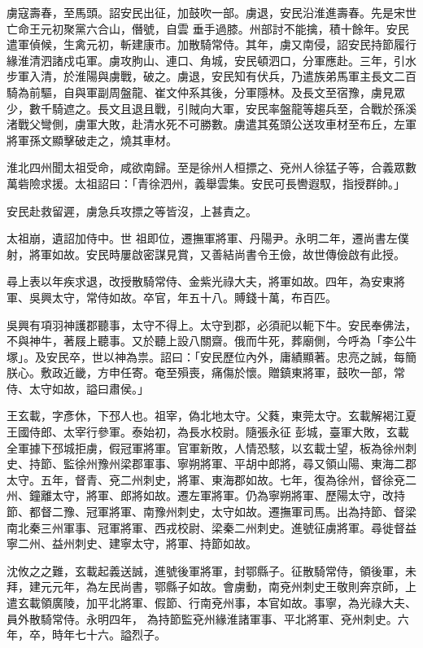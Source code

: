 \begin{pinyinscope}
 虜寇壽春，至馬頭。詔安民出征，加鼓吹一部。虜退，安民沿淮進壽春。先是宋世亡命王元初聚黨六合山，僭號，自雲
 垂手過膝。州部討不能擒，積十餘年。安民遣軍偵候，生禽元初，斬建康市。加散騎常侍。其年，虜又南侵，詔安民持節履行緣淮清泗諸戍屯軍。虜攻朐山、連口、角城，安民頓泗口，分軍應赴。三年，引水步軍入清，於淮陽與虜戰，破之。虜退，安民知有伏兵，乃遣族弟馬軍主長文二百騎為前驅，自與軍副周盤龍、崔文仲系其後，分軍隱林。及長文至宿豫，虜見眾少，數千騎遮之。長文且退且戰，引賊向大軍，安民率盤龍等趨兵至，合戰於孫溪渚戰父彎側，虜軍大敗，赴清水死不可勝數。虜遣其菟頭公送攻車材至布丘，左軍將軍孫文顯擊破走之，燒其車材。



 淮北四州聞太祖受命，咸欲南歸。至是徐州人桓摽之、兗州人徐猛子等，合義眾數萬砦險求援。太祖詔曰：「青徐泗州，義舉雲集。安民可長轡遐馭，指授群帥。」



 安民赴救留遲，虜急兵攻摽之等皆沒，上甚責之。



 太祖崩，遺詔加侍中。世
 祖即位，遷撫軍將軍、丹陽尹。永明二年，遷尚書左僕射，將軍如故。安民時屢啟密謀見賞，又善結尚書令王儉，故世傳儉啟有此授。



 尋上表以年疾求退，改授散騎常侍、金紫光祿大夫，將軍如故。四年，為安東將軍、吳興太守，常侍如故。卒官，年五十八。賻錢十萬，布百匹。



 吳興有項羽神護郡聽事，太守不得上。太守到郡，必須祀以軛下牛。安民奉佛法，不與神牛，著屐上聽事。又於聽上設八關齋。俄而牛死，葬廟側，今呼為「李公牛塚」。及安民卒，世以神為祟。詔曰：「安民歷位內外，庸績顯著。忠亮之誠，每簡朕心。敷政近畿，方申任寄。奄至殞喪，痛傷於懷。贈鎮東將軍，鼓吹一部，常侍、太守如故，謚曰肅侯。」



 王玄載，字彥休，下邳人也。祖宰，偽北地太守。父蕤，東莞太守。玄載解褐江夏王國侍郎、太宰行參軍。泰始初，為長水校尉。隨張永征
 彭城，臺軍大敗，玄載全軍據下邳城拒虜，假冠軍將軍。官軍新敗，人情恐駭，以玄載士望，板為徐州刺史、持節、監徐州豫州梁郡軍事、寧朔將軍、平胡中郎將，尋又領山陽、東海二郡太守。五年，督青、兗二州刺史，將軍、東海郡如故。七年，復為徐州，督徐兗二州、鐘離太守，將軍、郎將如故。遷左軍將軍。仍為寧朔將軍、歷陽太守，改持節、都督二豫、冠軍將軍、南豫州刺史，太守如故。遷撫軍司馬。出為持節、督梁南北秦三州軍事、冠軍將軍、西戎校尉、梁秦二州刺史。進號征虜將軍。尋徙督益寧二州、益州刺史、建寧太守，將軍、持節如故。



 沈攸之之難，玄載起義送誠，進號後軍將軍，封鄂縣子。征散騎常侍，領後軍，未拜，建元元年，為左民尚書，鄂縣子如故。會虜動，南兗州刺史王敬則奔京師，上遣玄載領廣陵，加平北將軍、假節、行南兗州事，本官如故。事寧，為光祿大夫、員外散騎常侍。永明四年，
 為持節監兗州緣淮諸軍事、平北將軍、兗州刺史。六年，卒，時年七十六。謚烈子。




\end{pinyinscope}
